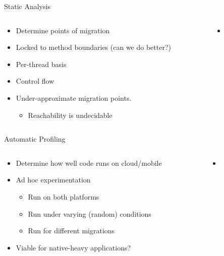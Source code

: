\documentclass{beamer}
\begin{document}
\begin{frame}{Static Analysis}
\begin{columns}
\begin{column}{5cm}
\begin{itemize}
	\item Determine points of migration
	\item Locked to method boundaries (can we do better?)
	\item Per-thread basis
	\item Control flow
	\item Under-approximate migration points.
	\begin{itemize}
		\item Reachability is undecidable
	\end{itemize}
\end{itemize}
\end{column}
\begin{column}{5cm}
\begin{itemize}
	\begin{itemize}
		\item {}
	\end{itemize}
\end{itemize}
\end{column}
\end{columns}
\end{frame}

\begin{frame}{Automatic Profiling}
\begin{columns}
\begin{column}{5cm}
\begin{itemize}
	\item Determine how well code runs on cloud/mobile
	\item Ad hoc experimentation
	\begin{itemize}
		\item Run on both platforms
		\item Run under varying (random) conditions
		\item Run for different migrations
	\end{itemize}
	\item Viable for native-heavy applications?
\end{itemize}
\end{column}
\begin{column}{5cm}
\begin{itemize}
	\begin{itemize}
		\item {}
	\end{itemize}
\end{itemize}
\end{column}
\end{columns}
\end{frame}
\end{document}
